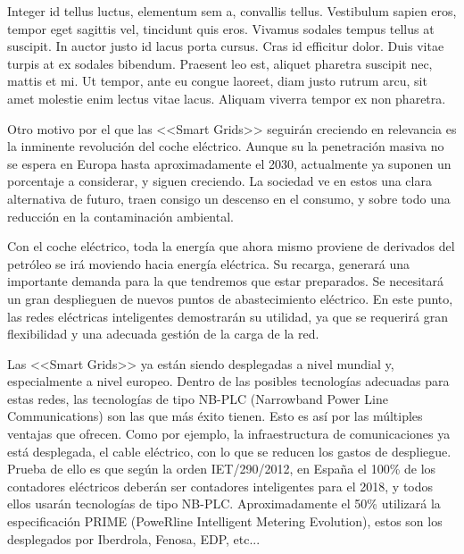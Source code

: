  Integer id tellus luctus, elementum sem a, convallis tellus. Vestibulum sapien eros, tempor eget sagittis vel, tincidunt quis eros. Vivamus sodales tempus tellus at suscipit. In auctor justo id lacus porta cursus. Cras id efficitur dolor. Duis vitae turpis at ex sodales bibendum. Praesent leo est, aliquet pharetra suscipit nec, mattis et mi. Ut tempor, ante eu congue laoreet, diam justo rutrum arcu, sit amet molestie enim lectus vitae lacus. Aliquam viverra tempor ex non pharetra.
 
 Otro motivo por el que las <<Smart Grids>> seguirán creciendo en relevancia es la inminente revolución del coche eléctrico. Aunque su la penetración masiva no se espera en Europa hasta aproximadamente el 2030, actualmente ya suponen un porcentaje a considerar, y siguen creciendo. La sociedad ve en estos una clara alternativa de futuro, traen consigo un descenso en el consumo, y sobre todo una reducción en la contaminación ambiental.
 
 Con el coche eléctrico, toda la energía que ahora mismo proviene de derivados del petróleo se irá moviendo hacia energía eléctrica. Su recarga, generará una importante demanda para la que tendremos que estar preparados. Se necesitará un gran desplieguen de nuevos puntos de abastecimiento eléctrico. En este punto, las redes eléctricas inteligentes demostrarán su utilidad, ya que se requerirá gran flexibilidad y una adecuada gestión de la carga de la red. 
 
 Las <<Smart Grids>> ya están siendo desplegadas a nivel mundial y, especialmente a nivel europeo. Dentro de las posibles tecnologías adecuadas para estas redes, las tecnologías de tipo NB-PLC (Narrowband Power Line Communications) son las que más éxito tienen. Esto es así por las múltiples ventajas que ofrecen. Como por ejemplo, la infraestructura de comunicaciones ya está desplegada, el cable eléctrico, con lo que se reducen los gastos de despliegue. Prueba de ello es que según la orden IET/290/2012, en España el 100\% de los contadores eléctricos deberán ser contadores inteligentes para el 2018, y todos ellos usarán tecnologías de tipo NB-PLC. Aproximadamente el 50\% utilizará la especificación PRIME (PoweRline Intelligent Metering Evolution), estos son los desplegados por Iberdrola, Fenosa, EDP, etc...
 
 
 
 
 
 
 
 
 